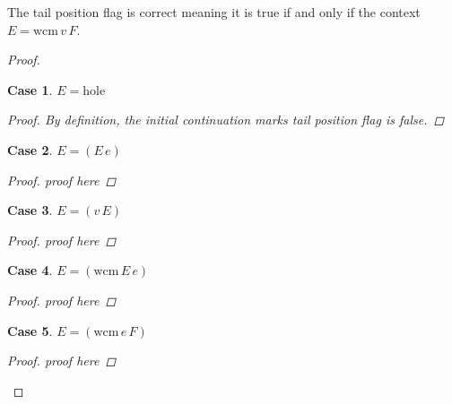\documentclass[ms,electronic,twosidetoc,letterpaper,chaptercenter,parttop]{byumsphd}
\begin{document}
\newtheorem{case_tpf}{Case}
\begin{thm}
The tail position flag is correct meaning it is true if and only if the context $E=\mathrm{wcm}\,v\,F$.
\end{thm}
\begin{proof}
\begin{case_tpf}
$E=\mathrm{hole}$ %
\begin{proof}
By definition, the initial continuation marks tail position flag is false.
\end{proof}
\end{case_tpf}
\begin{case_tpf}
$E=(E\,e)$
\begin{proof}
proof here
\end{proof}
\end{case_tpf}
\begin{case_tpf}
$E=(v\,E)$
\begin{proof}
proof here
\end{proof}
\end{case_tpf}
\begin{case_tpf}
$E=(\mathrm{wcm}\,E\,e)$
\begin{proof}
proof here
\end{proof}
\end{case_tpf}
\begin{case_tpf}
$E=(\mathrm{wcm}\,e\,F)$
\begin{proof}
proof here
\end{proof}
\end{case_tpf}
\end{proof}


\end{document}

